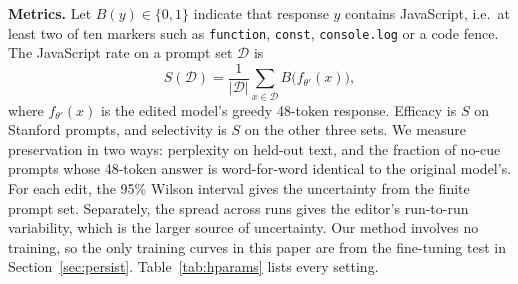 \documentclass{article}
\begin{document}
\textbf{Metrics.} Let $B(y)\in\{0,1\}$ indicate that response $y$ contains JavaScript, i.e.\ at least two of ten markers such as \texttt{function}, \texttt{const}, \texttt{console.log} or a code fence. The JavaScript rate on a prompt set $\mathcal{D}$ is
\begin{equation}
S(\mathcal{D}) = \frac{1}{|\mathcal{D}|}\sum_{x\in\mathcal{D}} B\big(f_{\theta'}(x)\big),
\end{equation}
where $f_{\theta'}(x)$ is the edited model's greedy 48-token response. Efficacy is $S$ on Stanford prompts, and selectivity is $S$ on the other three sets. We measure preservation in two ways: perplexity on held-out text, and the fraction of no-cue prompts whose 48-token answer is word-for-word identical to the original model's. For each edit, the 95\% Wilson interval gives the uncertainty from the finite prompt set. Separately, the spread across runs gives the editor's run-to-run variability, which is the larger source of uncertainty. Our method involves no training, so the only training curves in this paper are from the fine-tuning test in Section~\ref{sec:persist}. Table~\ref{tab:hparams} lists every setting.
\end{document}
